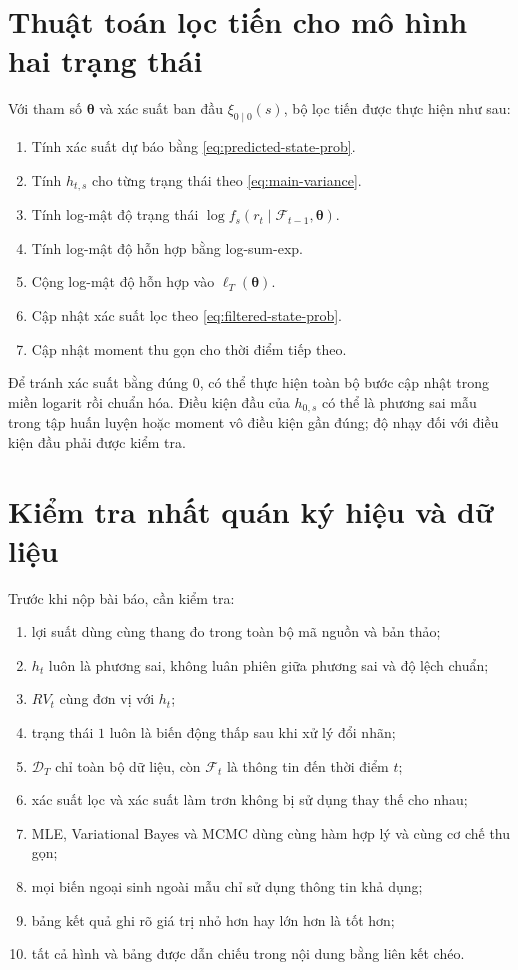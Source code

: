 \documentclass[12pt,a4paper]{article}
\numberwithin{equation}{section}
\newcommand{\bm}[1]{\symbf{#1}}
\newcommand{\Data}{\mathcal{D}}
\newcommand{\Info}{\mathcal{F}}
\newcommand{\Param}{\bm{\theta}}
\begin{document}
\section{Thuật toán lọc tiến cho mô hình hai trạng thái}\label{app:forward-filter}

Với tham số $\Param$ và xác suất ban đầu $\xi_{0\mid0}(s)$, bộ lọc tiến được thực hiện như sau:
\begin{enumerate}
  \item Tính xác suất dự báo bằng \cref{eq:predicted-state-prob}.
  \item Tính $h_{t,s}$ cho từng trạng thái theo \cref{eq:main-variance}.
  \item Tính log-mật độ trạng thái $\log f_s(r_t\mid\Info_{t-1},\Param)$.
  \item Tính log-mật độ hỗn hợp bằng log-sum-exp.
  \item Cộng log-mật độ hỗn hợp vào $\ell_T(\Param)$.
  \item Cập nhật xác suất lọc theo \cref{eq:filtered-state-prob}.
  \item Cập nhật moment thu gọn cho thời điểm tiếp theo.
\end{enumerate}

Để tránh xác suất bằng đúng $0$, có thể thực hiện toàn bộ bước cập nhật trong miền logarit rồi chuẩn hóa. Điều kiện đầu của $h_{0,s}$ có thể là phương sai mẫu trong tập huấn luyện hoặc moment vô điều kiện gần đúng; độ nhạy đối với điều kiện đầu phải được kiểm tra.

\section{Kiểm tra nhất quán ký hiệu và dữ liệu}\label{app:checklist}

Trước khi nộp bài báo, cần kiểm tra:
\begin{enumerate}
  \item lợi suất dùng cùng thang đo trong toàn bộ mã nguồn và bản thảo;
  \item $h_t$ luôn là phương sai, không luân phiên giữa phương sai và độ lệch chuẩn;
  \item $RV_t$ cùng đơn vị với $h_t$;
  \item trạng thái $1$ luôn là biến động thấp sau khi xử lý đổi nhãn;
  \item $\Data_T$ chỉ toàn bộ dữ liệu, còn $\Info_t$ là thông tin đến thời điểm $t$;
  \item xác suất lọc và xác suất làm trơn không bị sử dụng thay thế cho nhau;
  \item MLE, Variational Bayes và MCMC dùng cùng hàm hợp lý và cùng cơ chế thu gọn;
  \item mọi biến ngoại sinh ngoài mẫu chỉ sử dụng thông tin khả dụng;
  \item bảng kết quả ghi rõ giá trị nhỏ hơn hay lớn hơn là tốt hơn;
  \item tất cả hình và bảng được dẫn chiếu trong nội dung bằng liên kết chéo.
\end{enumerate}
\end{document}

